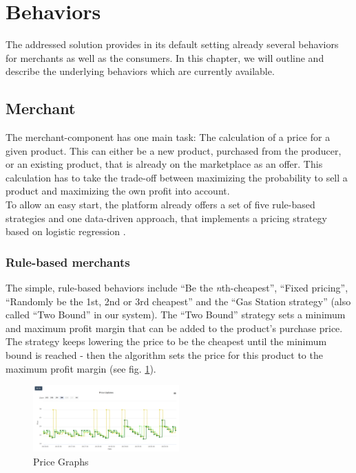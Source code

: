 \section{Behaviors}
\label{sec:Behaviors}
%
The addressed solution provides in its default setting already several behaviors for merchants as well as the consumers. In this chapter, we will outline and describe the underlying behaviors which are currently available.

\subsection{Merchant}
\label{sec:Behaviors_Merchants}
%
The merchant-component has one main task: The calculation of a price for a given product. This can either be a new product, purchased from the producer, or an existing product, that is already on the marketplace as an offer. This calculation has to take the trade-off between maximizing the probability to sell a product and maximizing the own profit into account. \\

To allow an easy start, the platform already offers a set of five rule-based strategies and one data-driven approach, that implements a pricing strategy based on logistic regression \citep{hosmer2013applied}.

\subsubsection{Rule-based merchants}

The simple, rule-based behaviors include ``Be the \textit{n}th-cheapest'', ``Fixed pricing'', ``Randomly be the 1st, 2nd or 3rd cheapest'' and the ``Gas Station strategy'' (also called ``Two Bound'' in our system). The ``Two Bound'' strategy sets a minimum and maximum profit margin that can be added to the product's purchase price. The strategy keeps lowering the price to be the cheapest until the minimum bound is reached - then the algorithm sets the price for this product to the maximum profit margin (see fig. \ref{fig:price_graphs_v2}). \\

%
\begin{figure}[h]
    \centering
    \includegraphics[width=0.5\textwidth]{images/price_graphs_v2.png}
    \caption{Price Graphs}
    \label{fig:price_graphs_v2}
\end{figure}
%

